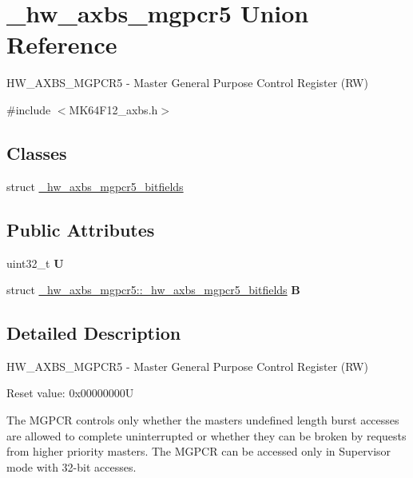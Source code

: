 \hypertarget{union__hw__axbs__mgpcr5}{}\section{\+\_\+hw\+\_\+axbs\+\_\+mgpcr5 Union Reference}
\label{union__hw__axbs__mgpcr5}


H\+W\+\_\+\+A\+X\+B\+S\+\_\+\+M\+G\+P\+C\+R5 -\/ Master General Purpose Control Register (RW)  




{\ttfamily \#include $<$M\+K64\+F12\+\_\+axbs.\+h$>$}

\subsection*{Classes}
\begin{DoxyCompactItemize}
\item 
struct \hyperlink{struct__hw__axbs__mgpcr5_1_1__hw__axbs__mgpcr5__bitfields}{\+\_\+hw\+\_\+axbs\+\_\+mgpcr5\+\_\+bitfields}
\end{DoxyCompactItemize}
\subsection*{Public Attributes}
\begin{DoxyCompactItemize}
\item 
uint32\+\_\+t {\bfseries U}\hypertarget{union__hw__axbs__mgpcr5_adfe6f9713959cf41a895094159e0c96e}{}\label{union__hw__axbs__mgpcr5_adfe6f9713959cf41a895094159e0c96e}

\item 
struct \hyperlink{struct__hw__axbs__mgpcr5_1_1__hw__axbs__mgpcr5__bitfields}{\+\_\+hw\+\_\+axbs\+\_\+mgpcr5\+::\+\_\+hw\+\_\+axbs\+\_\+mgpcr5\+\_\+bitfields} {\bfseries B}\hypertarget{union__hw__axbs__mgpcr5_ad587078b3e74d03244972d973c2e5188}{}\label{union__hw__axbs__mgpcr5_ad587078b3e74d03244972d973c2e5188}

\end{DoxyCompactItemize}


\subsection{Detailed Description}
H\+W\+\_\+\+A\+X\+B\+S\+\_\+\+M\+G\+P\+C\+R5 -\/ Master General Purpose Control Register (RW) 

Reset value\+: 0x00000000U

The M\+G\+P\+CR controls only whether the master\textquotesingle{}s undefined length burst accesses are allowed to complete uninterrupted or whether they can be broken by requests from higher priority masters. The M\+G\+P\+CR can be accessed only in Supervisor mode with 32-\/bit accesses. 

